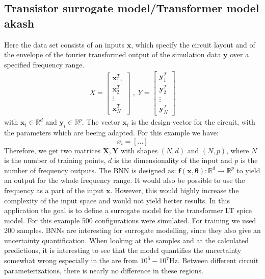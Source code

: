 \documentclass{article}
\begin{document}
\subsection{Transistor surrogate model/Transformer model akash}
Here the data set consists of an inputs $ \bm x$, which specify the circuit layout and of the envelope of the fourier transformed output of the simulation data $\bm y$ over a specified frequency range.
\begin{align}
    X = \begin{bmatrix}
        \bm x_1^T, \\
        \bm x_2^T\\
        \vdots\\
        \bm x_N^T
        \end{bmatrix} \;, \;
    Y = \begin{bmatrix}
        \bm y_1^T\\
        \bm y_2^T\\
        \vdots\\
        \bm y_N^T
    \end{bmatrix}
\end{align}
with $\bm x_i \in \mathbb{R}^d$ and $\bm y_i \in \mathbb{R}^{p}$. The vector $\bm x_i$ is the design vector for the circuit, with the parameters which are beeing adapted. For this example we have:
\begin{equation}
    x_i = [...]
\end{equation}Therefore, we get two matrices $\bm X, \bm Y$ with shapes $(N, d)$ and $(N, p)$, where $N$ is the number of training points, $d$ is the dimensionality of the input and $p$ is the number of frequency outputs. The BNN is designed as: $\bm f(\bm x, \bm \theta): \mathbb{R}^d \rightarrow \mathbb{R}^p$ to yield an output for the whole frequency range. It would also be possible to use the frequency as a part of the input $\bm x$. However, this would highly increase the complexity of the input space and would not yield better results. In this application the goal is to define a surrogate model for the transformer LT spice model. For this example 500 configurations were simulated. For training we used 200 samples. BNNs are interesting for surrogate modelling, since they also give an uncertainty quantification. When looking at the samples and at the calculated predictions, it is interesting to see that the model quantifies the uncertainty somewhat wrong especially in the are from $10^6 - 10^7 $Hz. Between different circuit parameterizations, there is nearly no difference in these regions. 
\end{document}
